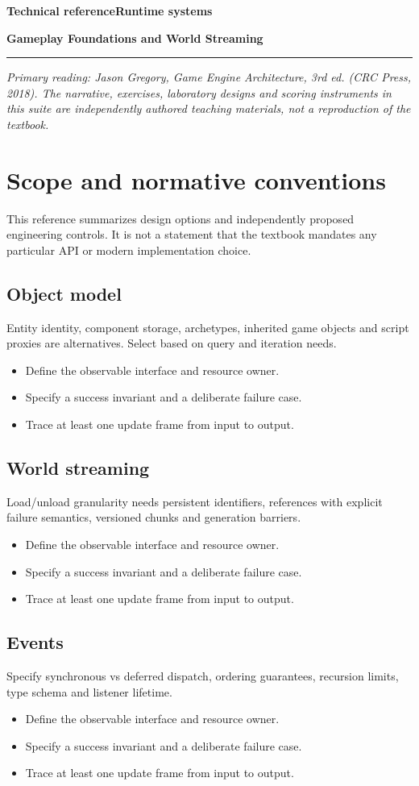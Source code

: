 \documentclass[11pt,letterpaper]{article}
\newcommand{\DocType}{Reference}
\newcommand{\SuiteHeading}[3]{%
\renewcommand{\DocType}{#2}%
{\small\bfseries\sffamily\color{EngineTeal}#2\hfill #3}\par\vspace{6pt}
{\LARGE\bfseries\color{EngineBlue}#1}\par\vspace{4pt}
{\color{EngineTeal}\rule{\linewidth}{1pt}}\par\vspace{7pt}}
\newcommand{\SourceNote}{\footnotesize\textit{Primary reading: Jason Gregory, \emph{Game Engine Architecture}, 3rd ed. (CRC Press, 2018). The narrative, exercises, laboratory designs and scoring instruments in this suite are independently authored teaching materials, not a reproduction of the textbook.}\normalsize\par}
\begin{document}
\SuiteHeading{Gameplay Foundations and World Streaming}{Technical reference}{Runtime systems}
\SourceNote
\section{Scope and normative conventions}
This reference summarizes design options and independently proposed engineering controls. It is not a statement that the textbook mandates any particular API or modern implementation choice.

\subsection{Object model}
Entity identity, component storage, archetypes, inherited game objects and script proxies are alternatives. Select based on query and iteration needs.

\begin{itemize}
\item Define the observable interface and resource owner.
\item Specify a success invariant and a deliberate failure case.
\item Trace at least one update frame from input to output.
\end{itemize}
\subsection{World streaming}
Load/unload granularity needs persistent identifiers, references with explicit failure semantics, versioned chunks and generation barriers.

\begin{itemize}
\item Define the observable interface and resource owner.
\item Specify a success invariant and a deliberate failure case.
\item Trace at least one update frame from input to output.
\end{itemize}
\subsection{Events}
Specify synchronous vs deferred dispatch, ordering guarantees, recursion limits, type schema and listener lifetime.

\begin{itemize}
\item Define the observable interface and resource owner.
\item Specify a success invariant and a deliberate failure case.
\item Trace at least one update frame from input to output.
\end{itemize}
\end{document}
